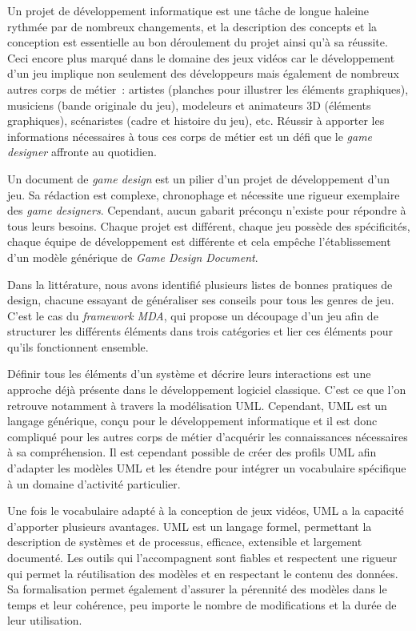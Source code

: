 \begin{conclusion}

Un projet de développement informatique est une tâche de longue haleine rythmée par de nombreux changements,
et
la description des concepts et la conception est essentielle au bon déroulement du projet ainsi qu'à sa réussite.
%
Ceci encore plus marqué dans le domaine des jeux vidéos car
le développement d'un jeu implique non seulement des développeurs mais également de nombreux autres corps de métier~: artistes (planches pour illustrer les éléments graphiques),  musiciens (bande originale du jeu), modeleurs et animateurs 3D (éléments graphiques), scénaristes (cadre et histoire du jeu), etc.
Réussir à apporter les informations nécessaires à tous ces corps de métier est un défi que le \emph{game designer} affronte au quotidien.

Un document de \emph{game design} est un pilier d'un projet de développement d'un jeu.
Sa rédaction est complexe, chronophage et nécessite une rigueur exemplaire des \emph{game designers}.
Cependant, aucun gabarit préconçu n'existe pour répondre à tous leurs besoins.
Chaque projet est différent, chaque jeu possède des spécificités, chaque équipe de développement est différente et cela empêche l'établissement d'un modèle générique de \emph{Game Design Document}.

Dans la littérature, nous avons identifié plusieurs listes de bonnes pratiques de design, chacune essayant de généraliser ses conseils pour tous les genres de jeu.
C'est le cas du \emph{framework MDA}, qui propose un découpage d'un jeu afin de structurer les différents éléments dans trois catégories et lier ces éléments pour qu'ils fonctionnent ensemble.

Définir tous les éléments d'un système et décrire leurs interactions est une approche déjà présente dans le développement logiciel classique.
C'est ce que l'on retrouve notamment à travers la modélisation UML.
Cependant, UML est un langage générique, conçu pour le développement informatique et il est donc compliqué pour les autres corps de métier d'acquérir les connaissances nécessaires à sa compréhension.
Il est cependant possible de créer des profils UML afin d'adapter les modèles UML et les étendre pour intégrer un vocabulaire spécifique à un domaine d'activité particulier.

Une fois le vocabulaire adapté à la conception de jeux vidéos, UML a la capacité d'apporter plusieurs avantages.
UML est un langage formel, permettant la description de systèmes et de processus, efficace, extensible et largement documenté.
Les outils qui l'accompagnent sont fiables et respectent une rigueur qui permet la réutilisation des modèles et en respectant le contenu des données.
Sa formalisation permet également d'assurer la pérennité des modèles dans le temps et leur cohérence, peu importe le nombre de modifications et la durée de leur utilisation.


\end{conclusion}
